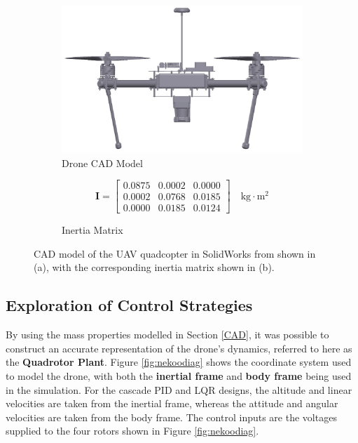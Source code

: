 \begin{figure}[H]
    \centering
    \begin{subfigure}[b]{0.5\textwidth} %
        \centering
        \includegraphics[width=\textwidth]{figs/Samuel/Figures/drone_new2 (cropped) (pdfresizer.com) (1)-1.png}
        \caption{Drone CAD Model}
        \label{fig:2a}
    \end{subfigure}
    \hspace{0.01\textwidth}
    \begin{subfigure}[b]{0.3\textwidth} %
        \centering
        \begin{equation*}
            \mathbf{I} =
            \begin{bmatrix}
                0.0875& 0.0002 & 0.0000 \\
                0.0002 & 0.0768 & 0.0185 \\
               0.0000 & 0.0185 & 0.0124
            \end{bmatrix} \quad \text{kg} \cdot \text{m}^2
        \end{equation*}
        \caption{Inertia Matrix}
        \label{fig:2b}
    \end{subfigure}
    \caption[CAD model of the UAV]{CAD model of the UAV quadcopter in SolidWorks from \cite{westin2019x4} shown in (a), with the corresponding inertia matrix shown in (b).}
    \label{fig:dronecad}
\end{figure}


\subsection{Exploration of Control Strategies}

By using the mass properties modelled in Section \ref{CAD}, it was possible to construct an accurate representation of the drone's dynamics, referred to here as the \textbf{Quadrotor Plant}. Figure \ref{fig:nekoodiag} shows the coordinate system used to model the drone, with both the \textbf{inertial frame} and \textbf{body frame} being used in the simulation. For the cascade \gls{PID} and \gls{LQR} designs, the altitude and linear velocities are taken from the inertial frame, whereas the attitude and angular velocities are taken from the body frame. The control inputs are the voltages supplied to the four rotors shown in Figure \ref{fig:nekoodiag}.


